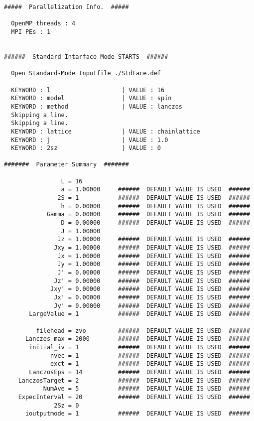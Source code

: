 \small
\begin{verbatim}
#####  Parallelization Info.  #####

  OpenMP threads : 4
  MPI PEs : 1 


######  Standard Intarface Mode STARTS  ######

  Open Standard-Mode Inputfile ./StdFace.def 

  KEYWORD : l                    | VALUE : 16 
  KEYWORD : model                | VALUE : spin 
  KEYWORD : method               | VALUE : lanczos 
  Skipping a line.
  Skipping a line.
  KEYWORD : lattice              | VALUE : chainlattice 
  KEYWORD : j                    | VALUE : 1.0 
  KEYWORD : 2sz                  | VALUE : 0 

#######  Parameter Summary  #######

                L = 16 
                a = 1.00000     ######  DEFAULT VALUE IS USED  ######
               2S = 1           ######  DEFAULT VALUE IS USED  ######
                h = 0.00000     ######  DEFAULT VALUE IS USED  ######
            Gamma = 0.00000     ######  DEFAULT VALUE IS USED  ######
                D = 0.00000     ######  DEFAULT VALUE IS USED  ######
                J = 1.00000   
               Jz = 1.00000     ######  DEFAULT VALUE IS USED  ######
              Jxy = 1.00000     ######  DEFAULT VALUE IS USED  ######
               Jx = 1.00000     ######  DEFAULT VALUE IS USED  ######
               Jy = 1.00000     ######  DEFAULT VALUE IS USED  ######
               J' = 0.00000     ######  DEFAULT VALUE IS USED  ######
              Jz' = 0.00000     ######  DEFAULT VALUE IS USED  ######
             Jxy' = 0.00000     ######  DEFAULT VALUE IS USED  ######
              Jx' = 0.00000     ######  DEFAULT VALUE IS USED  ######
              Jy' = 0.00000     ######  DEFAULT VALUE IS USED  ######
       LargeValue = 1           ######  DEFAULT VALUE IS USED  ######

         filehead = zvo         ######  DEFAULT VALUE IS USED  ######
      Lanczos_max = 2000        ######  DEFAULT VALUE IS USED  ######
       initial_iv = 1           ######  DEFAULT VALUE IS USED  ######
             nvec = 1           ######  DEFAULT VALUE IS USED  ######
             exct = 1           ######  DEFAULT VALUE IS USED  ######
       LanczosEps = 14          ######  DEFAULT VALUE IS USED  ######
    LanczosTarget = 2           ######  DEFAULT VALUE IS USED  ######
           NumAve = 5           ######  DEFAULT VALUE IS USED  ######
    ExpecInterval = 20          ######  DEFAULT VALUE IS USED  ######
              2Sz = 0  
      ioutputmode = 1           ######  DEFAULT VALUE IS USED  ######


\end{verbatim}
